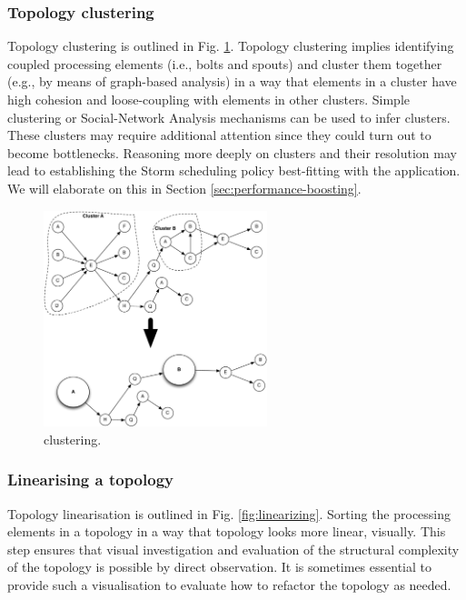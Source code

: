 \subsubsection{Topology clustering}\label{3}
Topology clustering is outlined in Fig. \ref{fig:clustering}. Topology clustering implies identifying coupled processing elements (i.e., bolts and spouts) and cluster them together (e.g., by means of graph-based analysis) in a way that elements in a cluster have high cohesion and loose-coupling with elements in other clusters. Simple clustering or Social-Network Analysis mechanisms can be used to infer clusters. These clusters may require additional attention since they could turn out to become bottlenecks. Reasoning more deeply on clusters and their resolution may lead to establishing the Storm scheduling policy best-fitting with the application. We will elaborate on this in Section \ref{sec:performance-boosting}.

\begin{figure}
	\begin{center}
		\includegraphics[width=6.5cm]{images/clustering}
		\caption{clustering.}
		\label{fig:clustering}
	\end{center}
\end{figure}

\subsubsection{Linearising a topology}\label{4}

Topology linearisation is outlined in Fig. \ref{fig:linearizing}. Sorting the processing elements in a topology in a way that topology looks more linear, visually. This step ensures that visual investigation and evaluation of the structural complexity of the topology is possible by direct observation. It is sometimes essential to provide such a visualisation to evaluate how to refactor the topology as needed.

